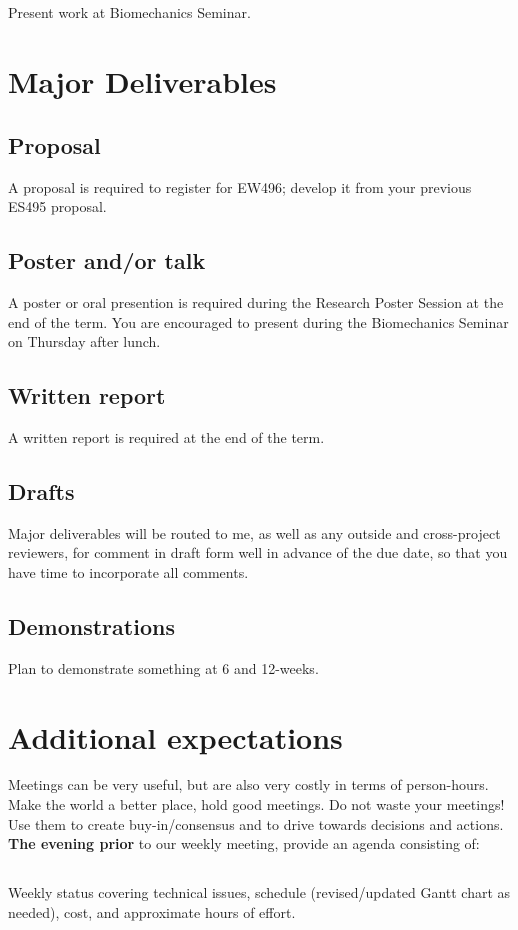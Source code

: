 \documentclass[10pt,courier]{navymemo}
\begin{document}
\subsection{} Present work at Biomechanics Seminar. 

\section{Major Deliverables}
\subsection{Proposal} A proposal is required to register for EW496; develop it from your previous ES495 proposal. 
\subsection{Poster and/or talk} A poster or oral presention is required during the Research Poster Session at the end of the term. You are encouraged to present during the Biomechanics Seminar on Thursday after lunch. 
\subsection{Written report} A written report is required at the end of the term. 
\subsection{Drafts} Major deliverables will be routed to me, as well as any outside and cross-project reviewers, for comment in draft form well in advance of the due date, so that you have time to incorporate all comments. 
\subsection{Demonstrations} Plan to demonstrate something at 6 and 12-weeks. 

\section{Additional expectations}  Meetings can be very useful, but are also very costly in terms of person-hours.  Make the world a better place, hold good meetings.  Do not waste your meetings! Use them to create buy-in/consensus and to drive towards decisions and actions.  \textbf{The evening prior} to our weekly meeting, provide an agenda consisting of:
\subsection{} Weekly status covering technical issues, schedule (revised/updated Gantt chart as needed), cost, and approximate hours of effort. 
\end{document}
